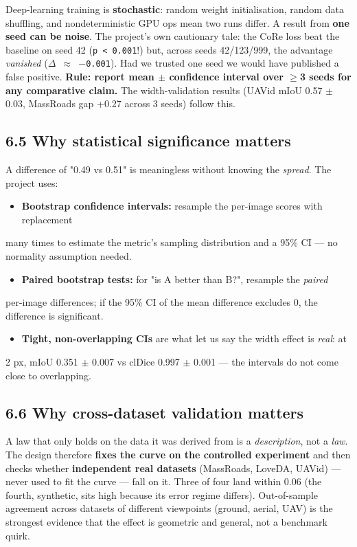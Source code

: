 \documentclass[11pt]{article}
\begin{document}
Deep-learning training is \textbf{stochastic}: random weight initialisation, random data shuffling, and nondeterministic GPU ops mean two runs differ. A result from \textbf{one seed can be noise}. The project's own cautionary tale: the CoRe loss beat the baseline on seed 42 (\texttt{p < 0.001}!) but, across seeds 42/123/999, the advantage \textit{vanished} (\texttt{$\Delta$ $\approx$ $-$0.001}). Had we trusted one seed we would have published a false positive. \textbf{Rule: report mean $\pm$ confidence interval over $\geq$3 seeds for any comparative claim.} The width-validation results (UAVid mIoU 0.57 $\pm$ 0.03, MassRoads gap +0.27 across 3 seeds) follow this.

\subsection*{6.5 Why statistical significance matters}

A difference of "0.49 vs 0.51" is meaningless without knowing the \textit{spread}. The project uses:
\begin{itemize}\setlength{\itemsep}{1pt}
\item \textbf{Bootstrap confidence intervals:} resample the per-image scores with replacement
\end{itemize}
  many times to estimate the metric's sampling distribution and a 95\% CI --- no   normality assumption needed.
\begin{itemize}\setlength{\itemsep}{1pt}
\item \textbf{Paired bootstrap tests:} for "is A better than B?", resample the \textit{paired}
\end{itemize}
  per-image differences; if the 95\% CI of the mean difference excludes 0, the   difference is significant.
\begin{itemize}\setlength{\itemsep}{1pt}
\item \textbf{Tight, non-overlapping CIs} are what let us say the width effect is \textit{real}: at
\end{itemize}
  2 px, mIoU 0.351 $\pm$ 0.007 vs clDice 0.997 $\pm$ 0.001 --- the intervals do not come close   to overlapping.

\subsection*{6.6 Why cross-dataset validation matters}

A law that only holds on the data it was derived from is a \textit{description}, not a \textit{law}. The design therefore \textbf{fixes the curve on the controlled experiment} and then checks whether \textbf{independent real datasets} (MassRoads, LoveDA, UAVid) --- never used to fit the curve --- fall on it. Three of four land within 0.06 (the fourth, synthetic, sits high because its error regime differs). Out-of-sample agreement across datasets of different viewpoints (ground, aerial, UAV) is the strongest evidence that the effect is geometric and general, not a benchmark quirk.
\end{document}
